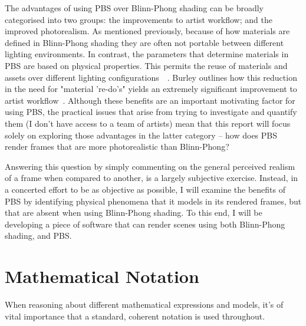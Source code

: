 The advantages of using PBS over Blinn-Phong shading can be broadly categorised into two groups: the improvements to artist workflow; and the improved photorealism. As mentioned previously, because of how materials are defined in Blinn-Phong shading they are often not portable between different lighting environments. In contrast, the parameters that determine materials in PBS are based on physical properties. This permits the reuse of materials and assets over different lighting configurations~\cite{movingFrostbitetoPBR}~\cite{SIGGRAPH2020Course}. Burley outlines how this reduction in the need for "material 're-do's" yields an extremely significant improvement to artist workflow~\cite{Burley2012Physically}. Although these benefits are an important motivating factor for using PBS, the practical issues that arise from trying to investigate and quantify them (I don’t have access to a team of artists) mean that this report will focus solely on exploring those advantages in the latter category – how does PBS render frames that are more photorealistic than Blinn-Phong?

Answering this question by simply commenting on the general perceived realism of a frame when compared to another, is a largely subjective exercise. Instead, in a concerted effort to be as objective as possible, I will examine the benefits of PBS by identifying physical phenomena that it models in its rendered frames, but that are absent when using Blinn-Phong shading. To this end, I will be developing a piece of software that can render scenes using both Blinn-Phong shading, and PBS.

\section{Mathematical Notation}

When reasoning about different mathematical expressions and models, it's of vital importance that a standard, coherent notation is used throughout.

